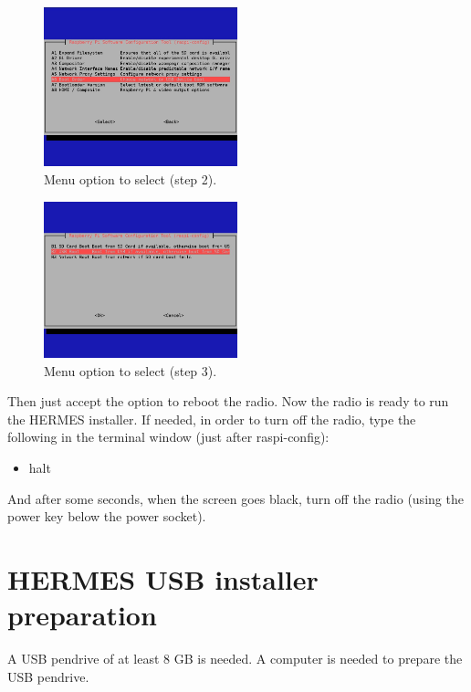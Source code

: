 \documentclass[11pt,a4paper]{article}
\begin{document}
\begin{figure}[H]
  \centering
  \includegraphics[width=0.5\textwidth]{pictures/screen5.jpg}
  \caption{Menu option to select (step 2).}
  \label{fig:screen5}
\end{figure}

\begin{figure}[H]
  \centering
  \includegraphics[width=0.5\textwidth]{pictures/screen6.jpg}
  \caption{Menu option to select (step 3).}
  \label{fig:screen6}
\end{figure}

Then just accept the option to reboot the radio.
Now the radio is ready to run the HERMES installer. If needed, in order to turn off the radio, type the following in the terminal window (just after raspi-config):

\begin{itemize}
\item halt
\end{itemize}

And after some seconds, when the screen goes black, turn off the radio (using the power key below the power socket).

\section{HERMES USB installer preparation}

A USB pendrive of at least 8 GB is needed. A computer is needed to prepare the USB pendrive.
\end{document}
